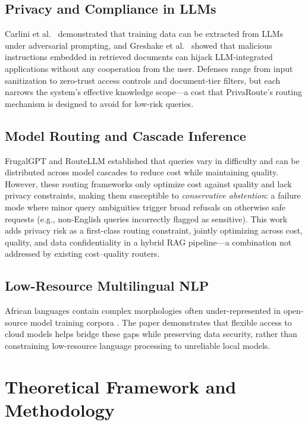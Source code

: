 \documentclass{article}
\begin{document}
\subsection{Privacy and Compliance in LLMs}
Carlini et al.\ \cite{carlini2021extracting} demonstrated that training data can be extracted from LLMs under adversarial prompting, and Greshake et al.\ \cite{greshake2023indirect} showed that malicious instructions embedded in retrieved documents can hijack LLM-integrated applications without any cooperation from the user. Defenses range from input sanitization to zero-trust access controls and document-tier filters, but each narrows the system's effective knowledge scope---a cost that PrivaRoute's routing mechanism is designed to avoid for low-risk queries.

\subsection{Model Routing and Cascade Inference}
FrugalGPT \cite{chen2023frugalgpt} and RouteLLM \cite{routellm2024} established that queries vary in difficulty and can be distributed across model cascades to reduce cost while maintaining quality. However, these routing frameworks only optimize cost against quality and lack privacy constraints, making them susceptible to \emph{conservative abstention}: a failure mode where minor query ambiguities trigger broad refusals on otherwise safe requests (e.g., non-English queries incorrectly flagged as sensitive). This work adds privacy risk as a first-class routing constraint, jointly optimizing across cost, quality, and data confidentiality in a hybrid RAG pipeline---a combination not addressed by existing cost--quality routers.

\subsection{Low-Resource Multilingual NLP}
African languages contain complex morphologies often under-represented in open-source model training corpora \cite{adelani2021masakhaner}. The paper demonstrates that flexible access to cloud models helps bridge these gaps while preserving data security, rather than constraining low-resource language processing to unreliable local models.

\section{Theoretical Framework and Methodology}
\end{document}

